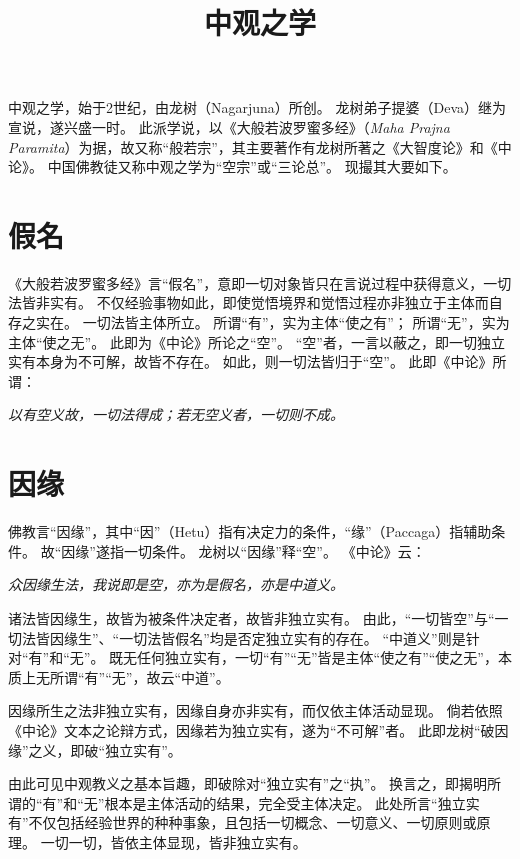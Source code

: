 \documentclass[11pt]{article}
\title{中观之学}
\date{}
\begin{document}
  \maketitle

  \linenumbers

中观之学，始于2世纪，由龙树（Nagarjuna）所创。
龙树弟子提婆（Deva）继为宣说，遂兴盛一时。
此派学说，以《大般若波罗蜜多经》（\textit{Maha Prajna Paramita}）为据，故又称“般若宗”，其主要著作有龙树所著之《大智度论》和《中论》。
中国佛教徒又称中观之学为“空宗”或“三论总”。
现撮其大要如下。

\section{假名}
《大般若波罗蜜多经》言“假名”，意即一切对象皆只在言说过程中获得意义，一切法皆非实有。
不仅经验事物如此，即使觉悟境界和觉悟过程亦非独立于主体而自存之实在。
一切法皆主体所立。
所谓“有”，实为主体“使之有”；
所谓“无”，实为主体“使之无”。
此即为《中论》所论之“空”。
“空”者，一言以蔽之，即一切独立实有本身为不可解，故皆不存在。
如此，则一切法皆归于“空”。
此即《中论》所谓：

\textit{以有空义故，一切法得成；若无空义者，一切则不成。}

\section{因缘}
佛教言“因缘”，其中“因”（Hetu）指有决定力的条件，“缘”（Paccaga）指辅助条件。
故“因缘”遂指一切条件。
龙树以“因缘”释“空”。
《中论》云：

\textit{众因缘生法，我说即是空，亦为是假名，亦是中道义。}

诸法皆因缘生，故皆为被条件决定者，故皆非独立实有。
由此，“一切皆空”与“一切法皆因缘生”、“一切法皆假名”均是否定独立实有的存在。
“中道义”则是针对“有”和“无”。
既无任何独立实有，一切“有”“无”皆是主体“使之有”“使之无”，本质上无所谓“有”“无”，故云“中道”。

\newline

因缘所生之法非独立实有，因缘自身亦非实有，而仅依主体活动显现。
倘若依照《中论》文本之论辩方式，因缘若为独立实有，遂为“不可解”者。
此即龙树“破因缘”之义，即破“独立实有”。

\newline

由此可见中观教义之基本旨趣，即破除对“独立实有”之“执”。
换言之，即揭明所谓的“有”和“无”根本是主体活动的结果，完全受主体决定。
此处所言“独立实有”不仅包括经验世界的种种事象，且包括一切概念、一切意义、一切原则或原理。
一切一切，皆依主体显现，皆非独立实有。
\end{document}

